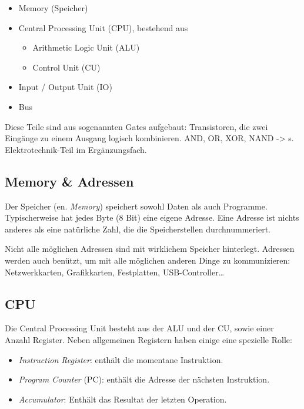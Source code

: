 \begin{itemize}
    \item Memory (Speicher)
    \item Central Processing Unit (CPU), bestehend aus
        \begin{itemize}
            \item Arithmetic Logic Unit (ALU)
            \item Control Unit (CU)
        \end{itemize}
    \item Input / Output Unit (IO)
    \item Bus
\end{itemize}

Diese Teile sind aus sogenannten Gates aufgebaut: Transistoren,
die zwei Eingänge zu einem Ausgang logisch kombinieren.
AND, OR, XOR, NAND -> s. Elektrotechnik-Teil im Ergänzungs\-fach.

\subsection{Memory \& Adressen}

Der Speicher (en. \emph{Memory}) speichert sowohl Daten als auch Programme. Typischerweise hat jedes Byte (8 Bit) eine eigene Adresse. Eine Adresse ist nichts anderes als eine natürliche Zahl, die die Speicherstellen durchnummeriert.


Nicht alle möglichen Adressen sind mit wirklichem Speicher hinterlegt. Adressen werden auch benützt, um mit alle möglichen anderen Dinge zu kommunizieren: Netzwerkkarten, Grafikkarten, Festplatten, USB-Controller…

\subsection{CPU}

Die Central Processing Unit besteht aus der ALU und der CU, sowie einer Anzahl Register. Neben allgemeinen Registern haben einige eine spezielle Rolle:
\begin{itemize}
	\item \emph{Instruction Register}: enthält die momentane Instruktion.
	\item \emph{Program Counter} (PC): enthält die Adresse der nächsten Instruktion.
	\item \emph{Accumulator}: Enthält das Resultat der letzten Operation.
\end{itemize}

